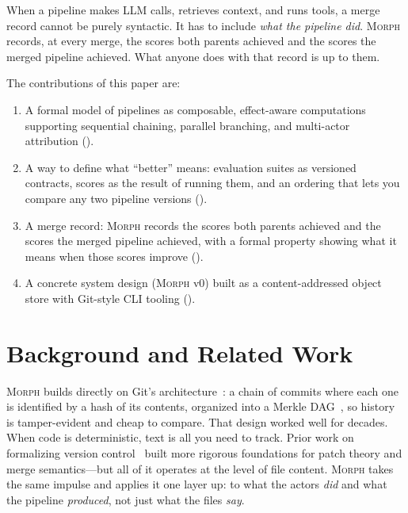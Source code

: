 \documentclass{article}
\begin{document}
When a pipeline makes LLM calls, retrieves context, and runs tools, a merge
record cannot be purely syntactic. It has to include \emph{what the pipeline did}.
\textsc{Morph} records, at every merge, the scores both parents achieved and
the scores the merged pipeline achieved. What anyone does with that record is
up to them.

The contributions of this paper are:

\begin{enumerate}[nosep]
  \item A formal model of pipelines as composable, effect-aware computations
    supporting sequential chaining, parallel branching, and multi-actor
    attribution ().
  \item A way to define what ``better'' means: evaluation suites as versioned
    contracts, scores as the result of running them, and an ordering that lets
    you compare any two pipeline versions ().
  \item A merge record: \textsc{Morph} records the scores both parents achieved
    and the scores the merged pipeline achieved, with a formal property showing
    what it means when those scores improve ().
  \item A concrete system design (\textsc{Morph} v0) built as a content-addressed
    object store with Git-style CLI tooling ().
\end{enumerate}

\section{Background and Related Work}
\label{sec:related}

\textsc{Morph} builds directly on Git's architecture~\citep{torvalds2005git}: a
chain of commits where each one is identified by a hash of its contents,
organized into a Merkle DAG~\citep{merkle1988digital}, so history is
tamper-evident and cheap to compare. That design worked well for decades.
When code is deterministic, text is all you need to track. Prior work on
formalizing version control~\citep{roundy2005darcs,angiuli2014homotopical,swierstra2014semantics}
built more rigorous foundations for patch theory and merge semantics---but all
of it operates at the level of file content. \textsc{Morph} takes the same
impulse and applies it one layer up: to what the actors \emph{did} and what
the pipeline \emph{produced}, not just what the files \emph{say}.
\end{document}
